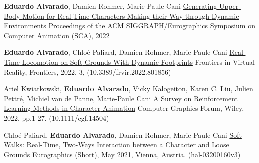

\begin{cventries}

\cvpublication
    {\textbf{Eduardo Alvarado}, Damien Rohmer, Marie-Paule Cani} %
    {\href{www.edualvarado.com}{Generating {Upper}-{Body} {Motion} for {Real}-{Time} {Characters} {Making} their {Way} through {Dynamic} {Environments}}} %
    {Proceedings of the ACM SIGGRAPH/Eurographics Symposium on Computer Animation (SCA), 2022} %

\cvpublication
    {\textbf{Eduardo Alvarado}, Chloé Paliard, Damien Rohmer, Marie-Paule Cani} %
    {\href{https://hal.inria.fr/hal-03630136}{Real-{Time} {Locomotion} on {Soft} {Grounds} {With} {Dynamic} {Footprints}}} %
    {Frontiers in Virtual Reality, Frontiers, 2022, 3, (10.3389/frvir.2022.801856)} %

\cvpublication
    {Ariel Kwiatkowski, \textbf{Eduardo Alvarado}, Vicky Kalogeiton, Karen C. Liu, Julien Pettr{\'{e}}, Michiel van de Panne, Marie-Paule Cani} %
    {\href{https://hal.inria.fr/hal-03600947}{A {Survey} on {Reinforcement} {Learning} {Methods} in {Character} {Animation}}} %
    {Computer Graphics Forum, Wiley, 2022, pp.1-27. (10.1111/cgf.14504)} %

\cvpublication
    {Chlo{\'{e}} Paliard, \textbf{Eduardo Alvarado}, Damien Rohmer, Marie-Paule Cani} %
    {\href{https://hal.inria.fr/hal-03200160/}{Soft {Walks}: {Real}-{Time}, {Two}-{Ways} {Interaction} between a {Character} and {Loose} {Grounds}}} %
    {Eurographics (Short), May 2021, Vienna, Austria. (hal-03200160v3)} %
    
\end{cventries}
